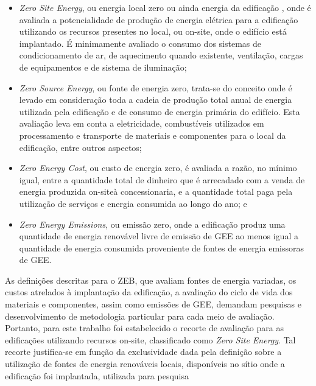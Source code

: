     \begin{itemize}
        \item \textit{Zero Site Energy}, ou energia local zero ou ainda energia da 
        edificação \cite{U.S.DepartmentofEnergy-USDOE2015}, onde é avaliada a 
        potencialidade de produção de energia elétrica para a  edificação  
        utilizando  os  recursos  presentes  no  local,  ou on-site,  onde  o  
        edifício  está implantado. É minimamente avaliado o consumo dos 
        sistemas de condicionamento de ar, de aquecimento quando existente, 
        ventilação, cargas de equipamentos e de sistema de iluminação;
        \item \textit{Zero Source Energy},  ou  fonte  de  energia  zero,  trata-se  do  
        conceito  onde  é  levado  em consideração toda a cadeia de produção 
        total anual de energia utilizada pela edificação e de consumo de 
        energia primária do edifício. Esta avaliação leva em conta a 
        eletricidade, combustíveis utilizados em processamento e transporte de 
        materiais e componentes para o local da edificação, entre outros aspectos;
        \item \textit{Zero Energy Cost}, ou custo de energia zero, é avaliada a razão, 
        no mínimo igual, entre a quantidade total de dinheiro que é arrecadado 
        com a venda de energia produzida on-siteà  concessionaria,  e  a  
        quantidade  total  paga  pela  utilização  de  serviços  e  energia 
        consumida ao longo do ano; e 
        \item \textit{Zero Energy Emissions},  ou  emissão  zero,  onde  a  edificação  
        produz  uma  quantidade  de energia  renovável  livre  de  emissão  
        de  GEE  ao  menos  igual  a  quantidade  de  energia consumida 
        proveniente de fontes de energia emissoras de GEE. 
    \end{itemize}
As definições descritas para o ZEB, que avaliam fontes de energia variadas, 
os custos atrelados à implantação da edificação, a avaliação do ciclo de vida 
dos materiais e componentes, assim como emissões de GEE, demandam pesquisas e 
desenvolvimento de metodologia particular para cada meio de avaliação. 
Portanto, para este trabalho foi estabelecido o recorte de avaliação para 
as edificações utilizando recursos on-site, classificado como \textit{Zero Site Energy}. 
Tal recorte justifica-se em função da exclusividade dada pela definição 
sobre a utilização de fontes de energia renováveis locais, 
disponíveis no sítio onde a edificação foi implantada, utilizada para pesquisa 
